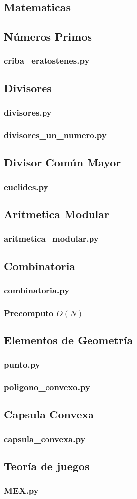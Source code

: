\documentclass{article}
\newcommand\codefile[2]{    
    \subsubsection{#2}
    
    
}
\begin{document}
\begin{multicols*}{2}
\section{Matematicas}

\subsection{Números Primos}
\codefile{matematicas/criba_eratostenes.py}{criba\_eratostenes.py}


\subsection{Divisores}
\codefile{matematicas/divisores.py}{divisores.py}
\codefile{matematicas/divisores_un_numero.py}{divisores\_un\_numero.py}

\subsection{Divisor Común Mayor}
\codefile{matematicas/euclides.py}{euclides.py}

\subsection{Aritmetica Modular}
\codefile{matematicas/aritmetica_modular.py}{aritmetica\_modular.py}

\subsection{Combinatoria}
\codefile{matematicas/combinatoria.py}{combinatoria.py}
\codefile{matematicas/precomputo_factoriales_e_inversos.py}{Precomputo $O(N)$}

\subsection{Elementos de Geometría}
\codefile{matematicas/punto.py}{punto.py}
\codefile{matematicas/poligono_convexo.py}{poligono\_convexo.py}

\subsection{Capsula Convexa}
\codefile{matematicas/capsula_convexa.py}{capsula\_convexa.py}

\subsection{Teoría de juegos}
\codefile{matematicas/MEX.py}{MEX.py}


\end{multicols*}
\end{document}
